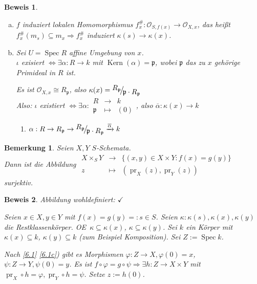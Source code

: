 \documentclass[paper = A4, fontsize=12pt, numbers=noendperiod, chapterprefix=true]{scrbook}
\theoremstyle{break}
\newtheorem{Bem}[Def]{Bemerkung}
\theoremstyle{nonumberbreak}
\newtheorem{bew}{Beweis}
\theoremstyle{nonumberplain}
\newcommand{\quot}[1]{\textrm{\glqq}{#1}\textrm{\grqq}}
\newenvironment{twosidedproof}{\begin{enumerate}[\quot{$\Rightarrow$}:]}{\end{enumerate}}
\newcommand{\proofreverse}{\item[\quot{$\Leftarrow$}:]}
\DeclareMathOperator{\Kern}{Kern}
\DeclareMathOperator{\Spec}{Spec}
\DeclareMathOperator{\pr}{pr}
\newcommand{\calO}{\mathcal{O}}
\newcommand{\p}{\mathfrak{p}} %
\newcommand{\X}{\times}
\newcommand{\FakRaum}[2]{
	\raisebox{0.7ex}{\ensuremath{#1}}
	\ensuremath{\mkern-3mu}\big/\ensuremath{\mkern-3mu}
	\raisebox{-0.6ex}{\ensuremath{#2}}}
\renewcommand{\OE}{O\!\!E~}
\begin{document}
\begin{bew}\begin{enumerate}[a)]
\item[b)]
	$f$ induziert lokalen Homomorphismus $f_x^\#: \calO_{S, f(x)} \to \calO_{X,x}$, das hei\ss t $f_x^\#(m_s) \subseteq m_x \Rightarrow f_x^\#$ induziert $\kappa(s) \to \kappa(x)$.
\item[c)]
	Sei $U = \Spec R$ affine Umgebung von $x$.\\
	$\iota$ exisiert $\Leftrightarrow\exists \alpha: R \to k$ mit $\Kern(\alpha) = \p$, wobei $\p$ das zu $x$ geh\"orige Primideal in $R$ ist.
	
	Es ist $\calO_{X, x} \cong R_{\p}$, also $\kappa(x) = \FakRaum{R_{\p}}{\p \cdot R_{\p}}$\\
	\emph{Also:} $\iota$ existiert $\Leftrightarrow \exists  \alpha: \begin{array}{ccc}R &\to& k \\ \p &\mapsto& (0)\end{array}$, also $\overline \alpha: \kappa(x) \to k$
	\begin{twosidedproof}\proofreverse $\alpha: R \to R_\p \to \FakRaum{R_{\p}}{\p \cdot R_{\p}} \xrightarrow{\overline \alpha} k$
\end{twosidedproof}\end{enumerate}\end{bew}

\begin{Bem}\label{6.2}
Seien $X, Y$ $S$-Schemata.\\
Dann ist die Abbildung $\begin{array}{ccc} X \X_S Y &\to& \{(x,y) \in X \X Y: f(x)=g(y)\} \\ z &\mapsto& (\pr_X(z), \pr_Y(z))\end{array}$ surjektiv.
\begin{center}
\end{center}
\end{Bem}

\begin{bew}
Abbildung wohldefiniert: $\checkmark$

Seien $x\in X, y \in Y$ mit $f(x) = g(y) =: s \in S$. Seien $\kappa: \kappa(s), \kappa(x), \kappa(y)$ die Restklassenk\"orper. \OE $\kappa \subseteq \kappa(x)$, $\kappa \subseteq \kappa(y)$. Sei $k$ ein K\"orper mit $\kappa(x) \subseteq k$, $\kappa(y) \subseteq k$ (zum Beispiel Komposition). Sei $Z:= \Spec k$.

Nach \ref{6.1} \ref{6.1c}) gibt es Morphismen $\varphi: Z \to X, \varphi(0) = x$, $\psi: Z \to Y, \psi(0) = y$. Es ist $f \circ \varphi = g \circ \psi \Rightarrow  \exists h: Z \to X \X Y$ mit $\pr_X \circ h = \varphi, \pr_Y \circ h = \psi$. Setze $z := h(0)$.
\end{bew}
\end{document}
